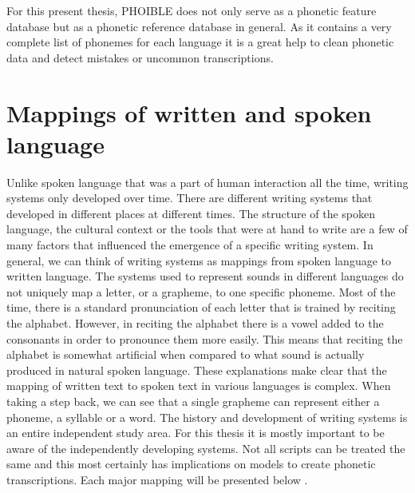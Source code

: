 For this present thesis, PHOIBLE does not only serve as a phonetic feature database but as a phonetic reference database in general. As it contains a very complete list of phonemes for each language it is a great help to clean phonetic data and detect mistakes or uncommon transcriptions.




\section{Mappings of written and spoken language}
\label{writing-sys}
Unlike spoken language that was a part of human interaction all the time, writing systems only developed over time. There are different writing systems that developed in different places at different times. The structure of the spoken language, the cultural context or the tools that were at hand to write are a few of many factors that influenced the emergence of a specific writing system. In general, we can think of writing systems as mappings from spoken language to written language. The systems used to represent sounds in different languages do not uniquely map a letter, or a grapheme, to one specific phoneme. Most of the time, there is a standard pronunciation of each letter that is trained by reciting the alphabet. However, in reciting the alphabet there is a vowel added to the consonants in order to pronounce them more easily. This means that reciting the alphabet is somewhat artificial when compared to what sound is actually produced in natural spoken language. These explanations make clear that the mapping of written text to spoken text in various languages is complex. When taking a step back, we can see that a single grapheme can represent either a phoneme, a syllable or a word. The history and development of writing systems is an entire independent study area. For this thesis it is mostly important to be aware of the independently developing systems. Not all scripts can be treated the same and this most certainly has implications on models to create phonetic transcriptions. Each major mapping will be presented below \citep{writing-systems}.

